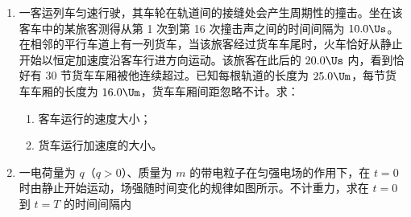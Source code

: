 \documentclass[\gkver]{gaokaozhenti}
\begin{document}
\begin{enumerate}
{\begin{enumerate}
	\item
	（i）减小实验结果的误差（2 分）；（ii）圆弧轨道存在摩擦（或接缝 B 处不平滑等）（2 分）

\end{enumerate}
}

\item
一客运列车匀速行驶，其车轮在轨道间的接缝处会产生周期性的撞击。坐在该客车中的某旅客测得从第 1 次到第 16 次撞击声之间的时间间隔为 $10.0\Us$。在相邻的平行车道上有一列货车，当该旅客经过货车车尾时，火车恰好从静止开始以恒定加速度沿客车行进方向运动。该旅客在此后的 $20.0\Us$ 内，看到恰好有 30 节货车车厢被他连续超过。已知每根轨道的长度为 $25.0\Um$，每节货车车厢的长度为 $16.0\Um$，货车车厢间距忽略不计。求：

\begin{enumerate}
	\item
	客车运行的速度大小；
	\item
	货车运行加速度的大小。
\end{enumerate}


\item
一电荷量为 $q$（$q>0$）、质量为 $m$ 的带电粒子在匀强电场的作用下，在 $t=0$ 时由静止开始运动，场强随时间变化的规律如图所示。不计重力，求在 $t=0$ 到 $t=T$ 的时间间隔内


\end{enumerate}
\end{document}
